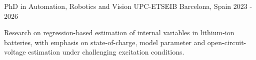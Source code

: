 \cventry
  {PhD in Automation, Robotics and Vision}
  {UPC-ETSEIB}
  {Barcelona, Spain}
  {2023 - 2026}
  {
    \begin{cvitems}
      \item {Research on regression-based estimation of internal variables in lithium-ion batteries, with emphasis on state-of-charge, model parameter and open-circuit-voltage estimation under challenging excitation conditions.}
    \end{cvitems}
  }
